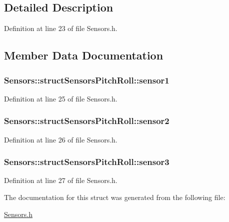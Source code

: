 \subsection{Detailed Description}


Definition at line 23 of file Sensors.\+h.



\subsection{Member Data Documentation}
\subsubsection[{\texorpdfstring{sensor1}{sensor1}}]{ Sensors\+::struct\+Sensors\+Pitch\+Roll\+::sensor1}\hypertarget{struct_sensors_1_1struct_sensors_pitch_roll_a61c1e63295d310224a0097a2cf4ca7f0}{}\label{struct_sensors_1_1struct_sensors_pitch_roll_a61c1e63295d310224a0097a2cf4ca7f0}


Definition at line 25 of file Sensors.\+h.

\subsubsection[{\texorpdfstring{sensor2}{sensor2}}]{ Sensors\+::struct\+Sensors\+Pitch\+Roll\+::sensor2}\hypertarget{struct_sensors_1_1struct_sensors_pitch_roll_a7d66e26e726b7a8d065b67b19e6305ef}{}\label{struct_sensors_1_1struct_sensors_pitch_roll_a7d66e26e726b7a8d065b67b19e6305ef}


Definition at line 26 of file Sensors.\+h.

\subsubsection[{\texorpdfstring{sensor3}{sensor3}}]{ Sensors\+::struct\+Sensors\+Pitch\+Roll\+::sensor3}\hypertarget{struct_sensors_1_1struct_sensors_pitch_roll_a57bd3f7dc8949180c8caa4b2b4a06d8f}{}\label{struct_sensors_1_1struct_sensors_pitch_roll_a57bd3f7dc8949180c8caa4b2b4a06d8f}


Definition at line 27 of file Sensors.\+h.



The documentation for this struct was generated from the following file\+:\begin{DoxyCompactItemize}
\item 
\hyperlink{_sensors_8h}{Sensors.\+h}\end{DoxyCompactItemize}
